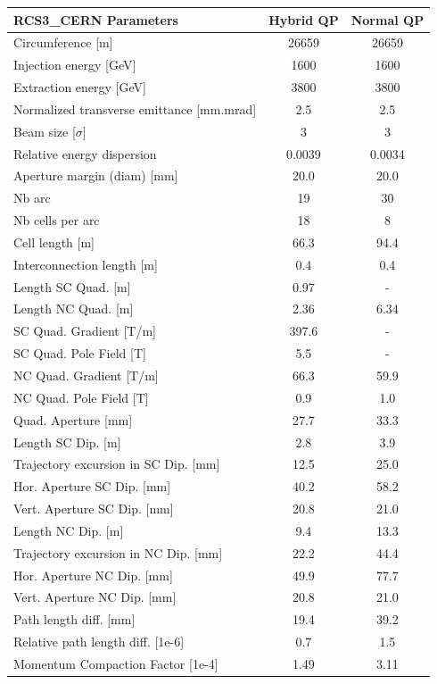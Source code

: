 \begin{tabular}{lcc}
\toprule
RCS3_CERN Parameters & Hybrid QP & Normal QP \\
\midrule
Circumference [m] & 26659 & 26659 \\
Injection energy [GeV] & 1600 & 1600 \\
Extraction energy [GeV] & 3800 & 3800 \\
Normalized transverse emittance [mm.mrad] & 2.5 & 2.5 \\
Beam size [$\sigma$] & 3 & 3 \\
Relative energy dispersion & 0.0039 & 0.0034 \\
Aperture margin (diam) [mm] & 20.0 & 20.0 \\
Nb arc & 19 & 30 \\
Nb cells per arc & 18 & 8 \\
Cell length [m] & 66.3 & 94.4 \\
Interconnection length [m] & 0.4 & 0.4 \\
Length SC Quad. [m] & 0.97 & - \\
Length NC Quad. [m] & 2.36 & 6.34 \\
SC Quad. Gradient [T/m] & 397.6 & - \\
SC Quad. Pole Field [T] & 5.5 & - \\
NC Quad. Gradient [T/m] & 66.3 & 59.9 \\
NC Quad. Pole Field [T] & 0.9 & 1.0 \\
Quad. Aperture [mm] & 27.7 & 33.3 \\
Length SC Dip. [m] & 2.8 & 3.9 \\
Trajectory excursion in SC Dip. [mm] & 12.5 & 25.0 \\
Hor. Aperture SC Dip. [mm] & 40.2 & 58.2 \\
Vert. Aperture SC Dip. [mm] & 20.8 & 21.0 \\
Length NC Dip. [m] & 9.4 & 13.3 \\
Trajectory excursion in NC Dip. [mm] & 22.2 & 44.4 \\
Hor. Aperture NC Dip. [mm] & 49.9 & 77.7 \\
Vert. Aperture NC Dip. [mm] & 20.8 & 21.0 \\
Path length diff. [mm] & 19.4 & 39.2 \\
Relative path length diff. [1e-6] & 0.7 & 1.5 \\
Momentum Compaction Factor [1e-4] & 1.49 & 3.11 \\
\bottomrule
\end{tabular}

